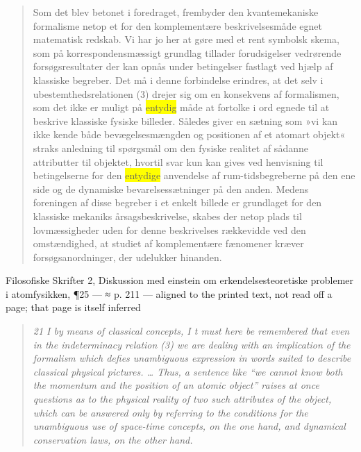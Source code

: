 \documentclass[11pt]{article}
\newcommand{\dcite}[1]{{\nopagebreak\raggedleft\small #1\par}\medskip}
\newcommand{\tlg}[1]{{\setlength{\fboxsep}{0.8pt}\colorbox{yellow}{#1}}}
\newcommand{\olg}[1]{{\setlength{\fboxsep}{0.8pt}\colorbox{cyan!25}{#1}}}
\begin{document}
\begin{quote}
Som det blev betonet i foredraget, frembyder den kvantemekaniske formalisme netop et for den komplementære beskrivelsesmåde egnet matematisk redskab. Vi har jo her at gøre med et rent symbolsk skema, som på korrespondensmæssigt grundlag tillader forudsigelser vedrørende forsøgsresultater der kan opnås under betingelser fastlagt ved hjælp af klassiske begreber. Det må i denne forbindelse erindres, at det selv i ubestemthedsrelationen (3) drejer sig om en konsekvens af formalismen, som det ikke er muligt på \tlg{entydig} måde at fortolke i ord egnede til at beskrive klassiske fysiske billeder. Således giver en sætning som »vi kan ikke kende både bevægelsesmængden og positionen af et atomart objekt« straks anledning til spørgsmål om den fysiske realitet af sådanne attributter til objektet, hvortil svar kun kan gives ved henvisning til betingelserne for den \tlg{entydige} anvendelse af rum-tidsbegreberne på den ene side og de dynamiske bevarelsessætninger på den anden. Medens foreningen af disse begreber i et enkelt billede er grundlaget for den klassiske mekaniks årsagsbeskrivelse, skabes der netop plads til lovmæssigheder uden for denne beskrivelses rækkevidde ved den omstændighed, at studiet af komplementære fænomener kræver forsøgsanordninger, der udelukker hinanden.
\end{quote}
\dcite{Filosofiske Skrifter 2, Diskussion med einstein om erkendelsesteoretiske problemer i atomfysikken, ¶25 — ≈ p. 211 — aligned to the printed text, not read off a page; that page is itself inferred}
{\footnotesize\begin{quote}\itshape
21 I by means of classical concepts, I t must here be remembered that even in the indeterminacy relation (3) we are dealing with an implication of the formalism which defies \olg{unambiguous} expression in words suited to describe classical physical pictures. … Thus, a sentence like “we cannot know both the momentum and the position of an atomic object” raises at once questions as to the physical reality of two such attributes of the object, which can be answered only by referring to the conditions for the \olg{unambiguous} use of space-time concepts, on the one hand, and dynamical conservation laws, on the other hand.
\end{quote}}
\end{document}
